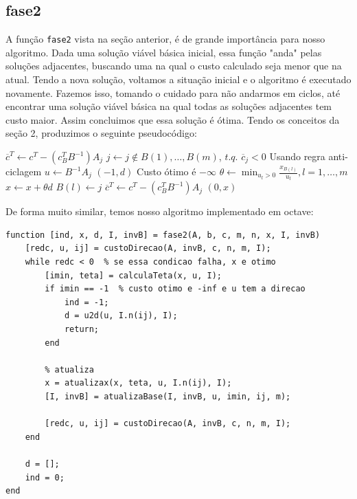 \documentclass[12pt]{article}
\begin{document}
\subsection{fase2}
	A função \texttt{fase2} vista na seção anterior, é de grande importância para nosso algoritmo. Dada uma solução viável básica inicial, essa função "anda" pelas soluções adjacentes, buscando uma na qual o custo calculado seja menor que na atual. Tendo a nova solução, voltamos a situação inicial e o algoritmo é executado novamente. Fazemos isso, tomando o cuidado para não andarmos em ciclos, até encontrar uma solução viável básica na qual todas as soluções adjacentes tem custo maior. Assim concluimos que essa solução é ótima. Tendo os conceitos da seção 2, produzimos o seguinte pseudocódigo:

\begin{algorithmic}
		\State $\overline{c}^T \gets c^T - (c_B^T B^{-1})A_j$
			\State $j \gets j \not\in {B(1), \dots, B(m)}$, $t.q.$ $\overline{c}_j < 0$ \Comment Usando regra anti-ciclagem
			\State $u \gets B^{-1} A_j$
				\Return $(-1, d)$ \Comment Custo ótimo é $-\infty$
			\EndIf
			\State $\theta \gets \min_{u_l > 0} {\frac{x_{B(l)}}{u_l}}, l = 1, \dots, m$
			\State $x \gets x + \theta d$
			\State $B(l) \gets j$
			\State {}
			\State $\overline{c}^T \gets c^T - (c_B^T B^{-1})A_j$
		\EndWhile
		\Return $(0, x)$
	\EndFunction	
\end{algorithmic}

	De forma muito similar, temos nosso algoritmo implementado em octave:
	\begin{lstlisting}
function [ind, x, d, I, invB] = fase2(A, b, c, m, n, x, I, invB)
    [redc, u, ij] = custoDirecao(A, invB, c, n, m, I);
    while redc < 0  % se essa condicao falha, x e otimo
        [imin, teta] = calculaTeta(x, u, I);
        if imin == -1  % custo otimo e -inf e u tem a direcao
            ind = -1;
            d = u2d(u, I.n(ij), I);
            return;
        end

        % atualiza
        x = atualizax(x, teta, u, I.n(ij), I); 
        [I, invB] = atualizaBase(I, invB, u, imin, ij, m);

        [redc, u, ij] = custoDirecao(A, invB, c, n, m, I);
    end
    
    d = [];
    ind = 0;
end 

    \end{lstlisting}
\end{document}
